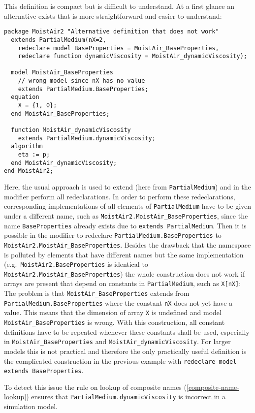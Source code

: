 \begin{nonnormative}
This definition is compact but is difficult to understand. At a
first glance an alternative exists that is more straightforward and
easier to understand:
\begin{lstlisting}[language=modelica]
package MoistAir2 "Alternative definition that does not work"
  extends PartialMedium(nX=2,
    redeclare model BaseProperties = MoistAir_BaseProperties,
    redeclare function dynamicViscosity = MoistAir_dynamicViscosity);

  model MoistAir_BaseProperties
    // wrong model since nX has no value
    extends PartialMedium.BaseProperties;
  equation
    X = {1, 0};
  end MoistAir_BaseProperties;

  function MoistAir_dynamicViscosity
    extends PartialMedium.dynamicViscosity;
  algorithm
    eta := p;
  end MoistAir_dynamicViscosity;
end MoistAir2;
\end{lstlisting}

Here, the usual approach is used to extend (here from \lstinline!PartialMedium!) and in the modifier perform all redeclarations.
In order to perform these redeclarations, corresponding implementations of all elements of \lstinline!PartialMedium! have to be given under a different name, such as \lstinline!MoistAir2.MoistAir_BaseProperties!, since the name \lstinline!BaseProperties! already exists due to \lstinline!extends PartialMedium!.
Then it is possible in the modifier to redeclare \lstinline!PartialMedium.BaseProperties! to \lstinline!MoistAir2.MoistAir_BaseProperties!.
Besides the drawback that the namespace is polluted by elements that have different names but the same implementation (e.g.\ \lstinline!MoistAir2.BaseProperties! is identical to \lstinline!MoistAir2.MoistAir_BaseProperties!) the whole construction does not work if arrays are present that depend on constants in \lstinline!PartialMedium!, such as \lstinline!X[nX]!:
The problem is that \lstinline!MoistAir_BaseProperties! extends from \lstinline!PartialMedium.BaseProperties! where the constant \lstinline!nX! does not yet have a value.
This means that the dimension of array \lstinline!X! is undefined and model \lstinline!MoistAir_BaseProperties! is wrong.
With this construction, all constant definitions have to be repeated whenever these constants shall be used, especially in \lstinline!MoistAir_BaseProperties! and \lstinline!MoistAir_dynamicViscosity!.
For larger models this is not practical and therefore the only practically useful definition is the complicated construction in the previous example with \lstinline!redeclare model extends BaseProperties!.

To detect this issue the rule on lookup of composite names (\cref{composite-name-lookup}) ensures that \lstinline!PartialMedium.dynamicViscosity! is incorrect in a simulation model.
\end{nonnormative}

